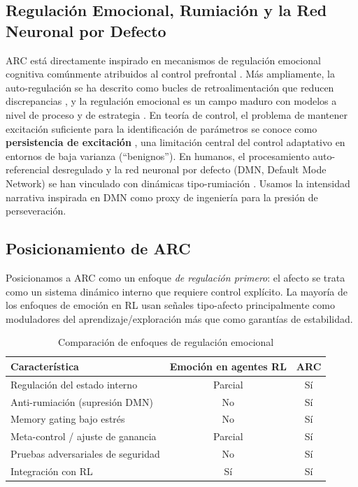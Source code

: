 \documentclass{article}
\begin{document}
\subsection{Regulación Emocional, Rumiación y la Red Neuronal por Defecto}

ARC está directamente inspirado en mecanismos de regulación emocional cognitiva comúnmente atribuidos al control prefrontal \cite{Ochsner2005}. Más ampliamente, la auto-regulación se ha descrito como bucles de retroalimentación que reducen discrepancias \cite{Carver1982}, y la regulación emocional es un campo maduro con modelos a nivel de proceso y de estrategia \cite{Gross1998}. En teoría de control, el problema de mantener excitación suficiente para la identificación de parámetros se conoce como \textbf{persistencia de excitación} \cite{Astrom2008}, una limitación central del control adaptativo en entornos de baja varianza (``benignos'').
En humanos, el procesamiento auto-referencial desregulado y la red neuronal por defecto (DMN, Default Mode Network) se han vinculado con dinámicas tipo-rumiación \cite{Raichle2001, Buckner2008, Hamilton2015}. Usamos la intensidad narrativa inspirada en DMN como proxy de ingeniería para la presión de perseveración.

\subsection{Posicionamiento de ARC}

Posicionamos a ARC como un enfoque \textit{de regulación primero}: el afecto se trata como un sistema dinámico interno que requiere control explícito. La mayoría de los enfoques de emoción en RL usan señales tipo-afecto principalmente como moduladores del aprendizaje/exploración más que como garantías de estabilidad.

\begin{table}[htbp]
\centering
\caption{Comparación de enfoques de regulación emocional}
\label{tab:comparison}
\begin{tabular}{@{}lcc@{}}
\toprule
Característica & Emoción en agentes RL \cite{Moerland2018} & \textbf{ARC} \\ \midrule
Regulación del estado interno & Parcial & Sí \\
Anti-rumiación (supresión DMN) & No & Sí \\
Memory gating bajo estrés & No & Sí \\
Meta-control / ajuste de ganancia & Parcial & Sí \\
Pruebas adversariales de seguridad & No & Sí \\
Integración con RL & Sí & Sí \\ \bottomrule
\end{tabular}
\end{table}
\end{document}
